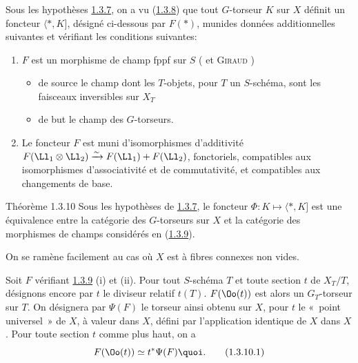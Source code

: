 \subsubsection{}
Sous les hypothèses \hyperref[XVIII.subsubsec1.3.7]{1.3.7}, 
on a vu (\hyperref[XVIII.for1.3.8]{1.3.8}) que tout $G$-torseur $K$
sur $X$ définit un foncteur $\langle \ast,K]$, désigné ci-dessous par
$F(\ast)$, 
muni\pageoriginale des données additionnelles suivantes et vérifiant
les conditions suivantes:
\begin{enumerate}
\renewcommand{\theenumi}{\roman{enumi}}
\renewcommand{\labelenumi}{(\theenumi)}
\item $F$ est un morphisme de champ fppf sur $S$
  ( et \textsc{Giraud} 
\cite{1})
\begin{itemize}
\item[--] de source le champ dont les $T$-objets, pour $T$ un
$S$-schéma, sont les faisceaux inversibles sur $X_{T}$

\item[--] de but le champ des $G$-torseurs.
\end{itemize}

\item Le foncteur $F$ est muni d'isomorphismes d'additivité
$F(\Ll_{1}\otimes \Ll_{2})\xrightarrow{\sim}F(\Ll_{1})+F(\Ll_{2})$,
fonctoriels, compatibles aux isomorphismes d'associativité et de
commutativité, et compatibles aux changements de base.
\end{enumerate}

\begin{enonce*}{Théorème 1.3.10}
Sous les hypothèses de \hyperref[XVIII.subsubsec1.3.7]{1.3.7}, le foncteur
$\Phi:K\mapsto \langle \ast,K]$ est 
une équivalence entre la catégorie des $G$-torseurs sur $X$ et la
catégorie des morphismes de champs considérés en
(\hyperref[XVIII.subsubsec1.3.9]{1.3.9}). 
\end{enonce*}

On se ramène facilement au cas où $X$ est à fibres connexes non vides.

Soit $F$ vérifiant \hyperref[XVIII.subsubsec1.3.9]{1.3.9} (i) et (ii). Pour tout
$S$-schéma $T$ et toute section $t$ de $X_{T}/T$, désignons encore par $t$ le diviseur
relatif $t(T)$. $F(\Oo(t))$ est alors un $G_{T}$-torseur sur $T$. On
désignera par $\Psi(F)$ le torseur ainsi obtenu sur $X$, pour $t$ le
« point universel »  de $X$, à valeur dans $X$, défini par
l'application identique de $X$ dans $X$. Pour toute section $t$ comme
plus haut, on a
\begin{equation*}
F(\Oo(t))\simeq t^{\ast}\Psi(F){\quoi}.\tag{1.3.10.1}
\end{equation*}

